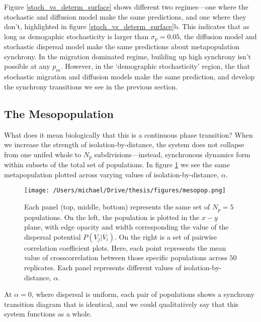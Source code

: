 Figure \ref{stoch_vs_determ_surface} shows different two regimes---one
where the stochastic and diffusion model make the same predictions, and
one where they don't, highlighted in figure
\ref{stoch_vs_determ_surface}b. This indicates that as long as
demogaphic stochasticity is larger than \(\sigma_p = 0.05\), the
diffusion model and stochastic dispersal model make the same predictions
about metapopulation synchrony. In the migration dominated regime,
building up high synchrony isn't possible at any \(p_m\). However, in
the `demographic stochasticity' region, the that stochastic migration
and diffusion models make the same prediction, and develop the synchrony
transitions we see in the previous section.

\hypertarget{the-mesopopulation}{%
\subsection{The Mesopopulation}\label{the-mesopopulation}}

What does it mean biologically that this is a continuous phase
transition? When we increase the strength of isolation-by-distance, the
system does not collapse from one unifed whole to \(N_p\)
subdivisions---instead, synchronous dynamics form within subsets of the
total set of populations. In figure \ref{mesopop} we see the same
metapopulation plotted across varying values of isolation-by-distance,
\(\alpha\).

\begin{figure}[H]

\texttt{[image: /Users/michael/Drive/thesis/figures/mesopop.png]}

\caption{Each panel (top, middle, bottom) represents the same set of $N_p=5$ populations. On the left, the population is plotted in the $x-y$ plane, with edge opacity and width corresponding the value of the dispersal potential $P(V_j | V_i)$. On the right is a set of pairwise correlation coefficient plots. Here, each point represents the mean value of crosscorrelation between those specific populations across $50$ replicates. Each panel represents different values of isolation-by-distance, $\alpha$.  }

\label{mesopop}

\end{figure}

At \(\alpha=0\), where dispersal is uniform, each pair of populations
shows a synchrony transition diagram that is identical, and we could
qualitatively say that this system functions as a whole.

